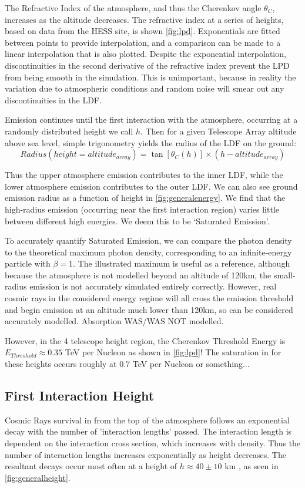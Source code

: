 \documentclass{article}
\begin{document}
The Refractive Index of the atmosphere, and thus the Cherenkov angle $\theta_{C}$, increases as the altitude decreases. The refractive index at a series of heights, based on data from the HESS site, is shown \ref{fig:lpd}. Exponentials are fitted between points to provide interpolation, and a comparison can be made to a linear interpolation that is also plotted. Despite the exponential interpolation, discontinuities in the second derivative of the refractive index prevent the LPD from being smooth in the simulation. This is unimportant, because in reality the variation due to atmospheric conditions and random noise will smear out any discontinuities in the LDF.

Emission continues until the first interaction with the atmosphere, occurring at a randomly distributed height we call $h$. Then for a given Telescope Array altitude above sea level, simple trigonometry yields the radius of the LDF on the ground:
\[ Radius(height = altitude_{array}) = \tan [\theta_{C}(h)] \times (h - altitude_{array})\]

Thus the upper atmosphere emission contributes to the inner LDF, while the lower atmosphere emission contributes to the outer LDF. We can also see ground emission radius as a function of height in \ref{fig:generalenergy}. We find that the high-radius emission (occurring near the first interaction region) varies little between different high energies. We deem this to be \textquoteleft Saturated Emission\textquoteright.

To accurately quantify Saturated Emission, we can compare the photon density to the theoretical maximum photon density, corresponding to an infinite-energy particle with $\beta =1$. The illustrated maximum is useful as a reference, although because the atmosphere is not modelled beyond an altitude of 120km, the small-radius emission is not accurately simulated entirely correctly. However, real cosmic rays in the considered energy regime will all cross the emission threshold and begin emission at an altitude much lower than 120km, so can be considered accurately modelled. Absorption WAS/WAS NOT modelled.

However, in the 4 telescope height region, the Cherenkov Threshold Energy is $ E_{Threshold} \approx 0.35$ TeV per Nucleon as shown in \ref{fig:lpd}! The saturation in for these heights occurs roughly at 0.7 TeV per Nucleon or something...

\subsection{First Interaction Height}
Cosmic Rays survival in from the top of the atmosphere follows an exponential decay with the number of 'interaction lengths' passed. The interaction length is dependent on the interaction cross section, which increases with density. Thus the number of interaction lengths increases exponentially as height decreases. The resultant decays occur most often at a height of $h \approx 40 \pm 10$ km , as seen in \ref{fig:generalheight}.
\end{document}
